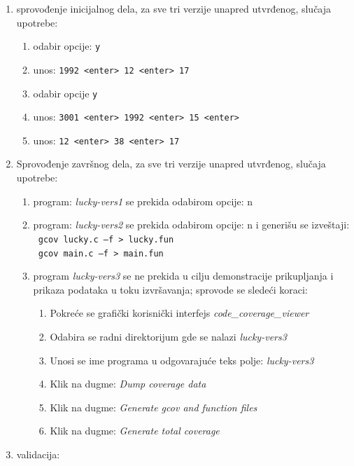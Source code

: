 \documentclass[12pt,oneside]{memoir}
\newcommand{\kod}[1]{\texttt{#1}}
\newcommand{\strano}[1]{\textit{#1}}
\begin{document}
\begin{enumerate}
\item sprovođenje inicijalnog dela, za sve tri verzije unapred utvrđenog, slučaja upotrebe:
\begin{enumerate}
\item odabir opcije: \kod{y}
\item unos: \kod{1992 <enter> 12 <enter> 17}
\item odabir opcije \kod{y}
\item unos: \kod{3001 <enter> 1992 <enter> 15 <enter>}
\item unos: \kod{12  <enter> 38 <enter> 17}
\end{enumerate}
\item Sprovođenje završnog dela, za sve tri verzije unapred utvrđenog, slučaja upotrebe:
\begin{enumerate}
\item program: \strano{lucky-vers1} se prekida odabirom opcije: n
\item program: \strano{lucky-vers2} se prekida odabirom opcije: n i generišu se izveštaji: \\
\kod{ gcov lucky.c –f  > lucky.fun} \\
\kod{ gcov main.c –f  > main.fun}
\item program \strano{lucky-vers3} se ne prekida u cilju demonstracije prikupljanja i prikaza podataka u toku izvršavanja; sprovode se sledeći koraci:
\begin{enumerate}
\item Pokreće se grafički korisnički interfejs \strano{code\_coverage\_viewer}
\item Odabira se radni direktorijum gde se nalazi \strano{lucky-vers3}
\item Unosi se ime programa u odgovarajuće teks polje: \strano{lucky-vers3}
\item Klik na dugme: \strano{Dump coverage data}
\item Klik na dugme: \strano{Generate gcov and function files}
\item Klik na dugme: \strano{Generate total coverage}
\end{enumerate}
\end{enumerate}
\item validacija: 
\begin{enumerate}


\end{enumerate}
\end{enumerate}
\end{document}
